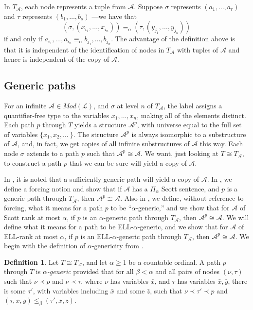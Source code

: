 \documentclass{article}
\newcommand{\ELL}{\textnormal{ELL}}
\theoremstyle{definition}
\newtheorem{defn}[thm]{Definition}
\begin{document}
	
	In $T_{\mathcal{A}}$, each node represents a tuple from $\mathcal{A}$.  Suppose $\sigma$ represents $(a_1,\ldots,a_r)$ and $\tau$ represents $(b_1,\ldots,b_s)$  ---we have that \[(\sigma,(x_{i_1},\ldots,x_{i_n})) \equiv_\alpha (\tau,(y_{j_1},\ldots,y_{j_n}))\]
	if and only if $a_{i_1},\ldots,a_{i_n} \equiv_\alpha b_{j_1},\ldots,b_{j_n}$. The advantage of the definition above is that it is independent of the identification of nodes in $T_{\mathcal{A}}$ with tuples of $\mathcal{A}$ and hence is independent of the copy of $\mathcal{A}$.
	
	\subsection{Generic paths}
	
	For an infinite $\mathcal{A}\in Mod(\mathcal{L})$, and $\sigma$ at level $n$ of $T_\mathcal{A}$, the label assigns a quantifier-free type to the variables $x_1,\ldots,x_n$, making all of the elements distinct. Each path $p$ through $T$ yields a structure $\mathcal{A}^p$, with universe equal to the full set of variables $\{x_1,x_2,\ldots\ \}$. The structure $\mathcal{A}^p$ is always isomorphic to a substructure of $\mathcal{A}$, and, in fact, we get copies of all infinite substructures of $\mathcal{A}$ this way. Each node $\sigma$ extends to a path $p$ such that $\mathcal{A}^p\cong\mathcal{A}$. We want, just looking at $T\cong T_\mathcal{A}$, to construct a path $p$ that we can be sure will yield a copy of $\mathcal{A}$. 
	
	In \cite{HTMontalban}, it is noted that a sufficiently generic path will yield a copy of $\mathcal{A}$. 
	In \cite{GonzalezKnight}, we define a forcing notion and show that if $\mathcal{A}$ has a $\Pi_\alpha$ Scott sentence, and $p$ is a generic path through $T_\mathcal{A}$, then $\mathcal{A}^p\cong\mathcal{A}$. Also in \cite{GonzalezKnight}, we define, without reference to forcing, what it means for a path $p$ to be ``$\alpha$-generic,'' and we show that for $\mathcal{A}$ of Scott rank at most $\alpha$, if $p$ is an $\alpha$-generic path through $T_\mathcal{A}$, then $\mathcal{A}^p\cong\mathcal{A}$. 
	We will define what it means for a path to be \ELL-$\alpha$-generic, and we show that for $\mathcal{A}$ of \ELL-rank at most $\alpha$, if $p$ is an \ELL-$\alpha$-generic path through $T_\mathcal{A}$, then $\mathcal{A}^p\cong\mathcal{A}$. 
	We begin with the definition of $\alpha$-genericity from \cite{GonzalezKnight}. 
	
	\begin{defn}
		Let $T \cong T_\mathcal{A}$, and let $\alpha\geq 1$ be a countable ordinal. A path $p$ through $T$ is \emph{$\alpha$-generic} provided that for all $\beta < \alpha$ and all pairs of nodes $(\nu,\tau)$ such that $\nu\prec p$ and $\nu\prec\tau$, where $\nu$ has variables $\bar{x}$, and $\tau$ has variables $\bar{x},\bar{y}$, there is some $\tau'$, with variables including $\bar{x}$ and some $\bar{z}$, such that $\nu\prec\tau'\prec p$ and $(\tau,\bar{x},\bar{y})\leq_\beta (\tau',\bar{x},\bar{z})$. 
	\end{defn}
	
\end{document}
